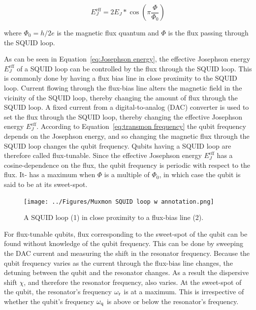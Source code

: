         \begin{equation}
          E_J^\text{eff}=2E_J*\cos{\left( \pi \frac{\Phi}{\Phi_0} \right)}
          \label{eq:Josephson energy}
        \end{equation}

        where $\Phi_0=h/2e$ is the magnetic flux quantum and $\Phi$ is the flux passing through the SQUID loop.

        As can be seen in Equation~\ref{eq:Josephson energy}, the effective Josephson energy $E_J^\text{eff}$ of a SQUID loop can be controlled by the flux through the SQUID loop. This is commonly done by having a flux bias line in close proximity to the SQUID loop. Current flowing through the flux-bias line alters the magnetic field in the vicinity of the SQUID loop, thereby changing the amount of flux through the SQUID loop. A fixed current from a digital-to-analog (DAC) converter is used to set the flux through the SQUID loop, thereby changing the effective Josephson energy $E_J^\text{eff}$. According to Equation~\ref{eq:transmon frequency} the qubit frequency depends on the Josephson energy, and so changing the magnetic flux through the SQUID loop changes the qubit frequency. Qubits having a SQUID loop are therefore called flux-tunable. Since the effective Josephson energy $E_J^\text{eff}$ has a cosine-dependence on the flux, the qubit frequency is periodic with respect to the flux. It- has a maximum when $\Phi$ is a multiple of $\Phi_0$, in which case the qubit is said to be at its sweet-spot.

        \begin{figure}
          \begin{center}
          \vspace{-30pt}
            \texttt{[image: ../Figures/Muxmon SQUID loop w annotation.png]}
          \end{center}
          \vspace{-20 pt}
          \caption{A SQUID loop (1) in close proximity to a flux-bias line (2).}
          \label{fig:SQUID loop}
        \end{figure}
        For flux-tunable qubits, flux corresponding to the sweet-spot of the qubit can be found without knowledge of the qubit frequency. This can be done by sweeping the DAC current and measuring the shift in the resonator frequency. Because the qubit frequency varies as the current through the flux-bias line changes, the detuning between the qubit and the resonator changes. As a result the dispersive shift $\chi$, and therefore the resonator frequency, also varies. At the sweet-spot of the qubit, the resonator's frequency $\omega_\text{r}$ is at a maximum. This is irrespective of whether the qubit's frequency $\omega_\text{q}$ is above or below the resonator's frequency.

